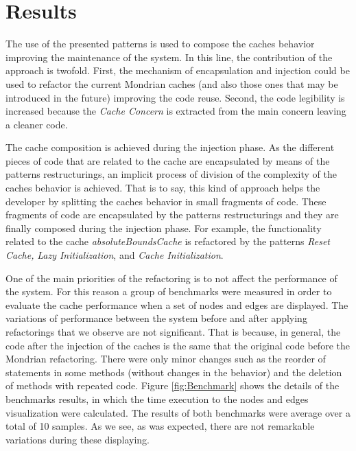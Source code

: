 \documentclass[preprint,10pt]{sigplanconf}
\newcommand{\seclabel}[1]{\label{sec:#1}}
\begin{document}
\section{Results}\seclabel{results}

The use of the presented patterns is used to compose the caches
behavior improving the maintenance of the system. In this line, the
contribution of the approach is twofold. First, the mechanism of encapsulation
and injection could be used to refactor the current Mondrian caches
(and also those ones that may be introduced in the future) improving the code
reuse. Second, the code legibility is increased because the \emph{Cache
Concern} is extracted from the main concern leaving a cleaner code.

The cache composition is achieved during the injection phase. As the
different pieces of code that are related to the cache are encapsulated
by means of the patterns restructurings, an implicit process of division of the complexity
of the caches behavior is achieved. That is to say, this kind of approach
helps the developer by splitting the caches behavior in small fragments
of code. These fragments of code are encapsulated by the patterns restructurings
and they are finally composed during the injection phase. For example,
the functionality related to the cache \emph{absoluteBoundsCache}
is refactored by the patterns \emph{Reset Cache,} \emph{Lazy Initialization}, and \emph{Cache Initialization}.

One of the main priorities of the refactoring is to not affect the performance of the system. 
For this reason a group of benchmarks were measured in order to evaluate the cache performance when a set of nodes and edges are displayed. The variations of performance between the system before and after applying refactorings that we observe are not significant. That is because, in general, the code after the injection of the caches is the same that the original code before the Mondrian refactoring. There were only minor changes such as the reorder of statements in some methods (without changes in the behavior) and the deletion of methods with repeated code. Figure \ref{fig:Benchmark} shows the details of the benchmarks results, in which the time execution to the nodes and edges visualization were calculated. The results of both benchmarks were average over a total of 10 samples. As we see, as was expected, there are not remarkable variations during these displaying.
\end{document}
